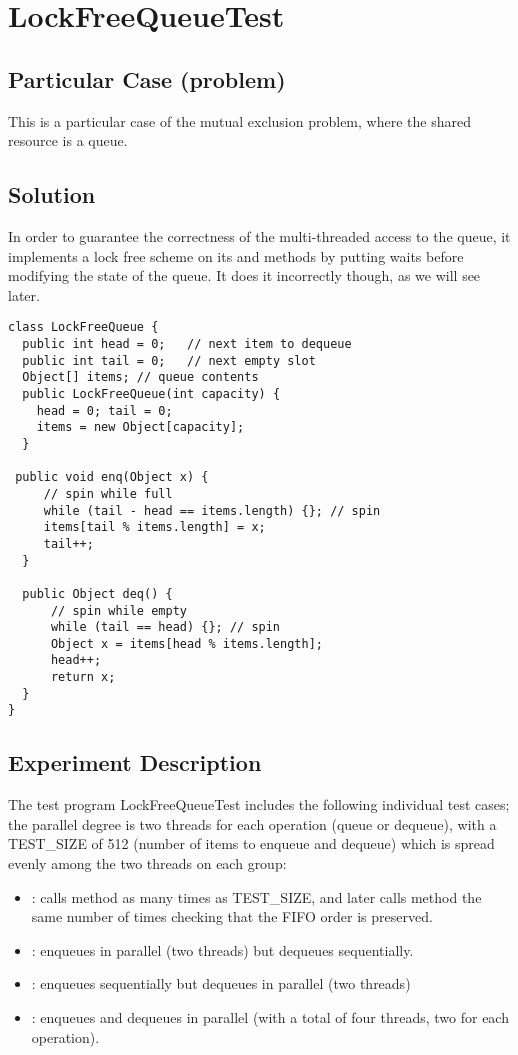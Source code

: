 \section{\textbf{LockFreeQueueTest}}

\subsection{Particular Case (problem)}
This is a particular case of the mutual exclusion problem, where the
shared resource is a queue.

\subsection{Solution}
In order to guarantee the correctness of
the multi-threaded access to the queue, it implements a lock free
scheme on its  and  methods by putting waits
before modifying the state of the queue. It does it incorrectly
though, as we will see later. \\

\begin{lstlisting}[style=numbers]
class LockFreeQueue {
  public int head = 0;   // next item to dequeue
  public int tail = 0;   // next empty slot
  Object[] items; // queue contents
  public LockFreeQueue(int capacity) {
    head = 0; tail = 0;
    items = new Object[capacity];
  }

 public void enq(Object x) {
     // spin while full
     while (tail - head == items.length) {}; // spin
     items[tail % items.length] = x;
     tail++;
  }

  public Object deq() {
      // spin while empty
      while (tail == head) {}; // spin
      Object x = items[head % items.length];
      head++;
      return x;
  }
}
\end{lstlisting}
\hfill

\subsection{Experiment Description}
The test program LockFreeQueueTest includes the following individual
test cases; the parallel degree is two threads for each operation
(queue or dequeue), with a TEST\_SIZE of 512 (number of items to
enqueue and dequeue) which is spread evenly among the two threads on
each group:

\begin{itemize}
  \item {}: calls  method as many times as
    TEST\_SIZE, and later calls  method the same number of
    times checking that the FIFO order is preserved. 
  \item {}: enqueues in parallel (two threads) but dequeues
    sequentially.
  \item {}: enqueues sequentially but dequeues in
    parallel (two threads)
  \item {}: enqueues and dequeues in parallel (with
    a total of four threads, two for each operation).
\end{itemize}

